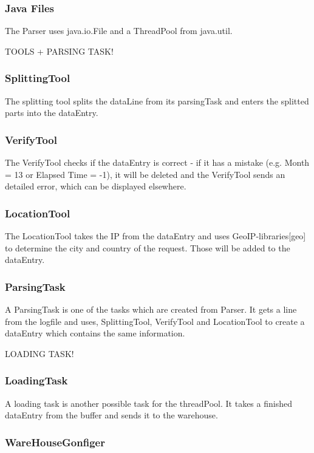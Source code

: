 \subsubsection*{Java Files}
The Parser uses java.io.File and a ThreadPool from java.util.

TOOLS + PARSING TASK!

\subsubsection*{SplittingTool}
The splitting tool splits the dataLine from its parsingTask and enters the splitted parts into the dataEntry.

\subsubsection*{VerifyTool}
The VerifyTool checks if the dataEntry is correct - if it has a mistake (e.g. Month = 13 or Elapsed Time = -1), it will 
be deleted and the VerifyTool sends an detailed error, which can be displayed elsewhere.

\subsubsection*{LocationTool}
The LocationTool takes the IP from the dataEntry and uses GeoIP-libraries[geo] to determine the city and country of the request.
Those will be added to the dataEntry.

\subsubsection*{ParsingTask}
A ParsingTask is one of the tasks which are created from Parser. It gets a line from the logfile and uses, SplittingTool, VerifyTool
and LocationTool to create a dataEntry which contains the same information. 

LOADING TASK! %


\subsubsection*{LoadingTask}
A loading task is another possible task for the threadPool. It takes a finished dataEntry from the buffer and sends it to the warehouse.

\subsubsection*{WareHouseGonfiger}

